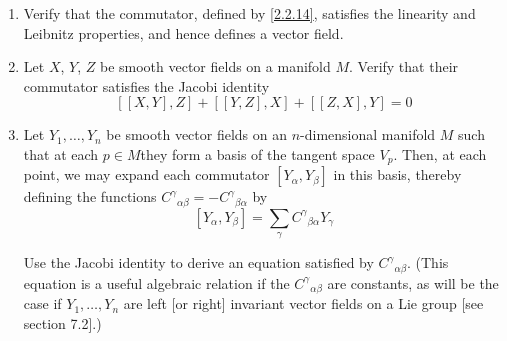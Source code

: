 \begin{problem}\leavevmode
    \begin{enumerate}[label=(\alph*)]
        \item Verify that the commutator, defined by \eqref{2.2.14}, satisfies the linearity and Leibnitz properties, and hence defines a vector field.
        \item Let $X$, $Y$, $Z$ be smooth vector fields on a manifold $M$. Verify that their commutator satisfies the Jacobi identity
        \[[[X,Y],Z]+[[Y,Z],X]+[[Z,X],Y]=0\]
        \item Let $Y_1,\ldots,Y_n$ be smooth vector fields on an $n$-dimensional manifold $M$ such that at each $p\in M$they form a basis of the tangent space $V_p$. Then, at each point, we may expand each commutator $[Y_\alpha,Y_\beta]$ in this basis, thereby defining the functions ${C^\gamma}_{\alpha\beta}=-{C^\gamma}_{\beta\alpha}$ by
        \[[Y_\alpha,Y_\beta]=\sum_\gamma {C^\gamma}_{\beta\alpha}Y_\gamma\]

        Use the Jacobi identity to derive an equation satisfied by ${C^\gamma}_{\alpha\beta}$. (This equation is a useful algebraic relation if the ${C^\gamma}_{\alpha\beta}$ are constants, as will be the case if $Y_1,\ldots,Y_n$ are left [or right] invariant vector fields on a Lie group [see section 7.2].)
    \end{enumerate}
\end{problem}
